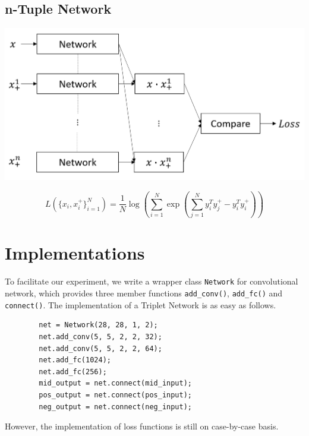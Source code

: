 \documentclass[a0,portrait]{a0poster}
\begin{document}
\begin{multicols}{2}
		\subsection*{n-Tuple Network}
		
		\begin{center}\vspace{1cm}
			\includegraphics[width=0.7\linewidth]{../report_shaoheng/tuple_struct}
		\end{center}\vspace{1cm}
		\begin{equation}
		L(\{x_i,x_i^+\}^N_{i=1})=\frac{1}{N}\log(\sum_{i=1}^N\exp(\sum_{j=1}^Ny^T_iy_j^+-y_i^Ty_i^+))  \label{eq:n-pair}
		\end{equation}
		
		\nocite{*} %
		
		
		\section*{Implementations}
		To facilitate our experiment, we write a wrapper class \verb|Network| for convolutional network, which provides three member functions \verb|add_conv()|, \verb|add_fc()| and \verb|connect()|. The implementation of a Triplet Network is as easy as follows.
		\begin{verbatim}
		net = Network(28, 28, 1, 2);
		net.add_conv(5, 5, 2, 2, 32);    
		net.add_conv(5, 5, 2, 2, 64);
		net.add_fc(1024);                
		net.add_fc(256);
		mid_output = net.connect(mid_input);
		pos_output = net.connect(pos_input);
		neg_output = net.connect(neg_input);
		\end{verbatim}
		However, the implementation of loss functions is still on case-by-case basis.

\end{multicols}
\end{document}
